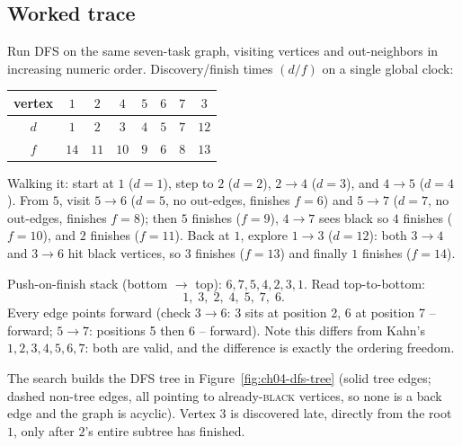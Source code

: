 \subsection*{Worked trace}

Run DFS on the same seven-task graph, visiting vertices and out-neighbors in increasing numeric
order. Discovery/finish times $(d/f)$ on a single global clock:

\begin{center}
\renewcommand{\arraystretch}{1.15}
\begin{tabular}{c c c c c c c c}
\toprule
vertex & $1$ & $2$ & $4$ & $5$ & $6$ & $7$ & $3$ \\
\midrule
$d$ & $1$ & $2$ & $3$ & $4$ & $5$ & $7$ & $12$ \\
$f$ & $14$ & $11$ & $10$ & $9$ & $6$ & $8$ & $13$ \\
\bottomrule
\end{tabular}
\end{center}

Walking it: start at $1$ ($d{=}1$), step to $2$ ($d{=}2$), $2\to 4$ ($d{=}3$), and $4\to 5$ ($d{=}4$).
From $5$, visit $5\to 6$ ($d{=}5$, no out-edges, finishes $f{=}6$) and $5\to 7$ ($d{=}7$, no out-edges,
finishes $f{=}8$); then $5$ finishes ($f{=}9$), $4\to 7$ sees black so $4$ finishes ($f{=}10$), and
$2$ finishes ($f{=}11$). Back at $1$, explore $1\to 3$ ($d{=}12$): both $3\to 4$ and $3\to 6$ hit black
vertices, so $3$ finishes ($f{=}13$) and finally $1$ finishes ($f{=}14$).

Push-on-finish stack (bottom $\to$ top): $6,7,5,4,2,3,1$. Read top-to-bottom:
\[
  1,\;3,\;2,\;4,\;5,\;7,\;6.
\]
Every edge points forward (check $3\to 6$: $3$ sits at position 2, $6$ at position 7 -- forward;
$5\to 7$: positions 5 then 6 -- forward). Note this differs from Kahn's $1,2,3,4,5,6,7$: both are
valid, and the difference is exactly the ordering freedom.

The search builds the DFS tree in Figure~\ref{fig:ch04-dfs-tree} (solid tree edges; dashed non-tree edges, all pointing to
already-\textsc{black} vertices, so none is a back edge and the graph is acyclic). Vertex $3$ is
discovered late, directly from the root $1$, only after $2$'s entire subtree has finished.

